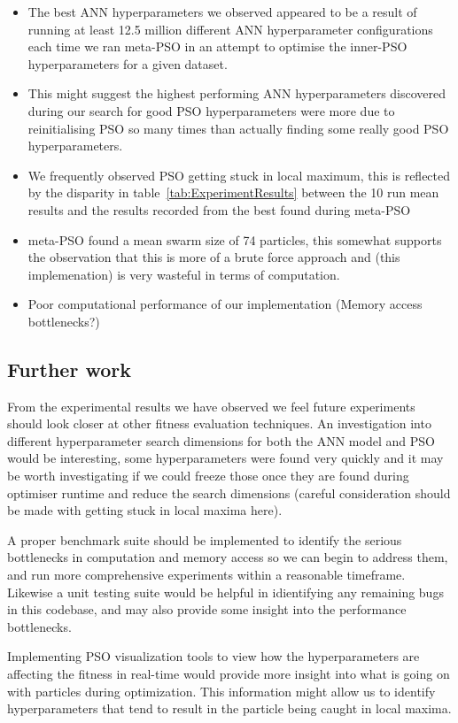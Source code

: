 \documentclass[11pt]{article}
\begin{document}
\begin{itemize}
    \item The best ANN hyperparameters we observed appeared to be a result of running at least 12.5 million different ANN hyperparameter configurations each time we ran meta-PSO in an attempt to optimise the inner-PSO hyperparameters for a given dataset.
    \item This might suggest the highest performing ANN hyperparameters discovered during our search for good PSO hyperparameters  were more due to reinitialising PSO so many times than actually finding some really good PSO hyperparameters.
    \item We frequently observed PSO getting stuck in local maximum, this is reflected by the disparity in table~\ref{tab:ExperimentResults} between the 10 run mean results and the results recorded from the best found during meta-PSO 
    \item meta-PSO found a mean swarm size of 74 particles, this somewhat supports the observation that this is more of a brute force approach and (this implemenation) is very wasteful in terms of computation. 
    \item Poor computational performance of our implementation (Memory access bottlenecks?)
\end{itemize}

\subsection{Further work}
From the experimental results we have observed we feel future experiments should look closer at other fitness evaluation techniques. 
An investigation into different hyperparameter search dimensions for both the ANN model and PSO would be interesting, some hyperparameters were found very quickly and it may be worth investigating if we could freeze those once they are found during optimiser runtime and reduce the search dimensions (careful consideration should be made with getting stuck in local maxima here). 

A proper benchmark suite should be implemented to identify the serious bottlenecks in computation and memory access so we can begin to address them, and run more comprehensive experiments within a reasonable timeframe.
Likewise a unit testing suite would be helpful in idientifying any remaining bugs in this codebase, and may also provide some insight into the performance bottlenecks.

Implementing PSO visualization tools to view how the hyperparameters are affecting the fitness in real-time would provide more insight into what is going on with particles during optimization. This information might allow us to identify hyperparameters that tend to result in the particle being caught in local maxima.
\end{document}
